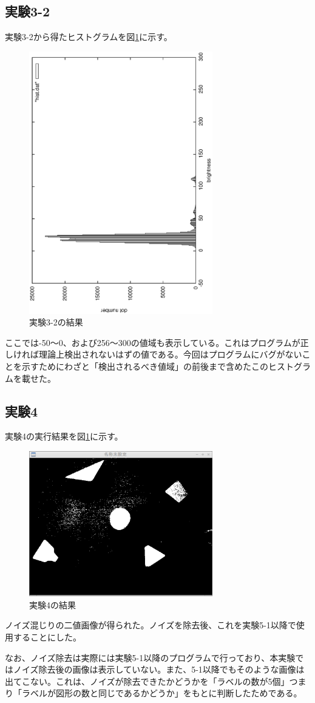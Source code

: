 \documentclass{jarticle}[2012/05/15]
\begin{document}
\subsection{実験3-2}
実験3-2から得たヒストグラムを図\ref{hist}に示す。\par
\begin{figure}[htbp]
  \centering
  \includegraphics[width=8cm, angle = 270]{hist.ps}
  \caption{実験3-2の結果} \label{hist}
\end{figure}
ここでは-50～0、および256～300の値域も表示している。これはプログラムが正しければ理論上検出されないはずの値である。今回はプログラムにバグがないことを示すためにわざと「検出されるべき値域」の前後まで含めたこのヒストグラムを載せた。
\pagebreak
\subsection{実験4}
実験4の実行結果を図\ref{hist}に示す。\par
\begin{figure}[htbp]
  \centering
  \includegraphics[width=8cm]{kadai04.eps}
  \caption{実験4の結果} \label{kadai04}
\end{figure}
ノイズ混じりの二値画像が得られた。ノイズを除去後、これを実験5-1以降で使用することにした。\par
なお、ノイズ除去は実際には実験5-1以降のプログラムで行っており、本実験ではノイズ除去後の画像は表示していない。また、5-1以降でもそのような画像は出てこない。これは、ノイズが除去できたかどうかを「ラベルの数が5個」つまり「ラベルが図形の数と同じであるかどうか」をもとに判断したためである。
\pagebreak
\end{document}
